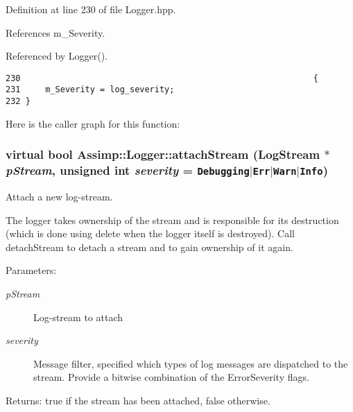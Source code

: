 Definition at line 230 of file Logger.hpp.

References m\_\-Severity.

Referenced by Logger().

\begin{Code}\begin{verbatim}230                                                           {
231     m_Severity = log_severity;
232 }
\end{verbatim}
\end{Code}




Here is the caller graph for this function:\hypertarget{class_assimp_1_1_logger_af32a42b02a7e227076013d01e349871}{
\subsubsection[attachStream]{\setlength{\rightskip}{0pt plus 5cm}virtual bool Assimp::Logger::attachStream ({\bf LogStream} $\ast$ {\em pStream}, \/  unsigned int {\em severity} = {\tt Debugging$|$Err$|$Warn$|$Info})}}
\label{class_assimp_1_1_logger_af32a42b02a7e227076013d01e349871}


Attach a new log-stream. 

The logger takes ownership of the stream and is responsible for its destruction (which is done using delete when the logger itself is destroyed). Call detachStream to detach a stream and to gain ownership of it again. \begin{Desc}
\item[Parameters:]
\begin{description}
\item[{\em pStream}]Log-stream to attach \item[{\em severity}]Message filter, specified which types of log messages are dispatched to the stream. Provide a bitwise combination of the ErrorSeverity flags. \end{description}
\end{Desc}
\begin{Desc}
\item[Returns:]true if the stream has been attached, false otherwise. \end{Desc}


